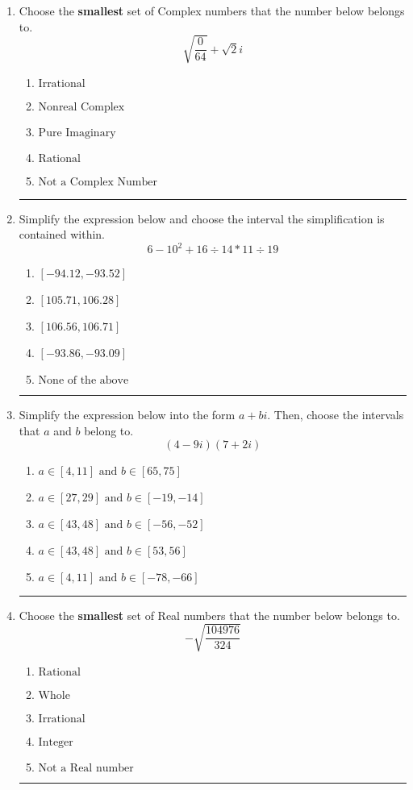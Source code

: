 \documentclass[14pt]{extbook}
\newcommand{\litem}[1]{\item#1\hspace*{-1cm}\rule{\textwidth}{0.4pt}}
\begin{document}
\begin{enumerate}
{\begin{enumerate}[label=\Alph*.]
\end{enumerate} }
\litem{
Choose the \textbf{smallest} set of Complex numbers that the number below belongs to.\[ \sqrt{\frac{0}{64}}+\sqrt{2}i \]\begin{enumerate}[label=\Alph*.]
\item \( \text{Irrational} \)
\item \( \text{Nonreal Complex} \)
\item \( \text{Pure Imaginary} \)
\item \( \text{Rational} \)
\item \( \text{Not a Complex Number} \)

\end{enumerate} }
\litem{
Simplify the expression below and choose the interval the simplification is contained within.\[ 6 - 10^2 + 16 \div 14 * 11 \div 19 \]\begin{enumerate}[label=\Alph*.]
\item \( [-94.12, -93.52] \)
\item \( [105.71, 106.28] \)
\item \( [106.56, 106.71] \)
\item \( [-93.86, -93.09] \)
\item \( \text{None of the above} \)

\end{enumerate} }
\litem{
Simplify the expression below into the form $a+bi$. Then, choose the intervals that $a$ and $b$ belong to.\[ (4 - 9 i)(7 + 2 i) \]\begin{enumerate}[label=\Alph*.]
\item \( a \in [4, 11] \text{ and } b \in [65, 75] \)
\item \( a \in [27, 29] \text{ and } b \in [-19, -14] \)
\item \( a \in [43, 48] \text{ and } b \in [-56, -52] \)
\item \( a \in [43, 48] \text{ and } b \in [53, 56] \)
\item \( a \in [4, 11] \text{ and } b \in [-78, -66] \)

\end{enumerate} }
\litem{
Choose the \textbf{smallest} set of Real numbers that the number below belongs to.\[ -\sqrt{\frac{104976}{324}} \]\begin{enumerate}[label=\Alph*.]
\item \( \text{Rational} \)
\item \( \text{Whole} \)
\item \( \text{Irrational} \)
\item \( \text{Integer} \)
\item \( \text{Not a Real number} \)


\end{enumerate}}
\end{enumerate}
\end{document}
